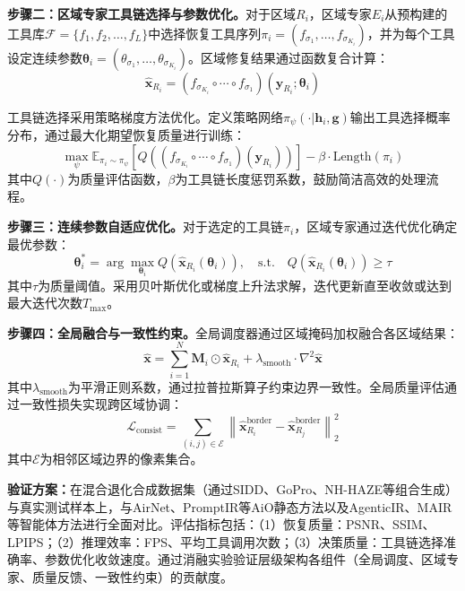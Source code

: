 \textbf{步骤二：区域专家工具链选择与参数优化。}对于区域$R_i$，区域专家$E_i$从预构建的工具库$\mathcal{F} = \{f_1, f_2, \ldots, f_L\}$中选择恢复工具序列$\pi_i = (f_{\sigma_1}, \ldots, f_{\sigma_{K_i}})$，并为每个工具设定连续参数$\boldsymbol{\theta}_i = (\theta_{\sigma_1}, \ldots, \theta_{\sigma_{K_i}})$。区域修复结果通过函数复合计算：
\begin{equation}
\hat{\mathbf{x}}_{R_i} = (f_{\sigma_{K_i}} \circ \cdots \circ f_{\sigma_1})(\mathbf{y}_{R_i}; \boldsymbol{\theta}_i)
\end{equation}

工具链选择采用策略梯度方法优化。定义策略网络$\pi_{\psi}(\cdot | \mathbf{h}_i, \mathbf{g})$输出工具选择概率分布，通过最大化期望恢复质量进行训练：
\begin{equation}
\max_{\psi} \mathbb{E}_{\pi_i \sim \pi_{\psi}}\left[Q\left((f_{\sigma_{K_i}} \circ \cdots \circ f_{\sigma_1})(\mathbf{y}_{R_i})\right)\right] - \beta \cdot \text{Length}(\pi_i)
\end{equation}
其中$Q(\cdot)$为质量评估函数，$\beta$为工具链长度惩罚系数，鼓励简洁高效的处理流程。

\textbf{步骤三：连续参数自适应优化。}对于选定的工具链$\pi_i$，区域专家通过迭代优化确定最优参数：
\begin{equation}
\boldsymbol{\theta}_i^{*} = \arg\max_{\boldsymbol{\theta}_i} Q\left(\hat{\mathbf{x}}_{R_i}(\boldsymbol{\theta}_i)\right), \quad \text{s.t.} \quad Q\left(\hat{\mathbf{x}}_{R_i}(\boldsymbol{\theta}_i)\right) \geq \tau
\end{equation}
其中$\tau$为质量阈值。采用贝叶斯优化或梯度上升法求解，迭代更新直至收敛或达到最大迭代次数$T_{\max}$。

\textbf{步骤四：全局融合与一致性约束。}全局调度器通过区域掩码加权融合各区域结果：
\begin{equation}
\hat{\mathbf{x}} = \sum_{i=1}^{N} \mathbf{M}_i \odot \hat{\mathbf{x}}_{R_i} + \lambda_{\text{smooth}} \cdot \nabla^2 \hat{\mathbf{x}}
\end{equation}
其中$\lambda_{\text{smooth}}$为平滑正则系数，通过拉普拉斯算子约束边界一致性。全局质量评估通过一致性损失实现跨区域协调：
\begin{equation}
\mathcal{L}_{\text{consist}} = \sum_{(i,j) \in \mathcal{E}} \left\| \hat{\mathbf{x}}_{R_i}^{\text{border}} - \hat{\mathbf{x}}_{R_j}^{\text{border}} \right\|_2^2
\end{equation}
其中$\mathcal{E}$为相邻区域边界的像素集合。

\textbf{验证方案：}在混合退化合成数据集（通过SIDD、GoPro、NH-HAZE等组合生成）与真实测试样本上，与AirNet、PromptIR等AiO静态方法以及AgenticIR、MAIR等智能体方法进行全面对比。评估指标包括：（1）恢复质量：PSNR、SSIM、LPIPS；（2）推理效率：FPS、平均工具调用次数；（3）决策质量：工具链选择准确率、参数优化收敛速度。通过消融实验验证层级架构各组件（全局调度、区域专家、质量反馈、一致性约束）的贡献度。

